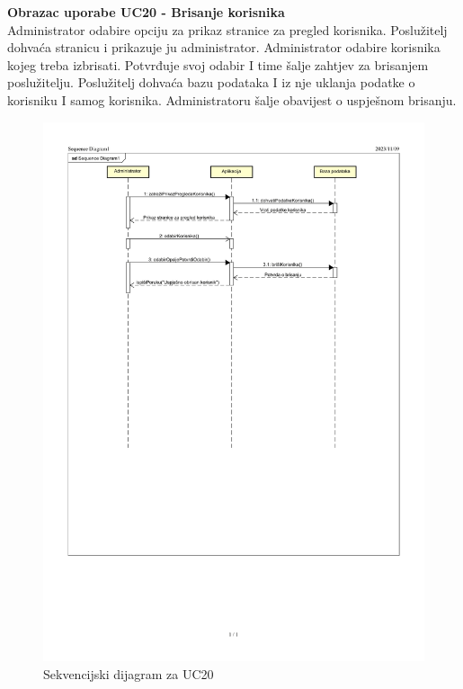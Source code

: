 				\eject
				
				
				\textbf{\large Obrazac uporabe UC20 - Brisanje korisnika}\\
				
				Administrator odabire opciju za prikaz stranice za pregled korisnika. Poslužitelj dohvaća stranicu i prikazuje ju administrator. Administrator odabire korisnika kojeg treba izbrisati. Potvrđuje svoj odabir I time šalje zahtjev za brisanjem poslužitelju. Poslužitelj dohvaća bazu podataka I iz nje uklanja podatke o korisniku I samog korisnika. Administratoru šalje obavijest o uspješnom brisanju.
				
				\begin{figure}[H]
						\includegraphics[scale=0.7]{slike/sek_dijagram4-1.PNG} %
						\centering
						\caption{Sekvencijski dijagram za UC20}
						\label{fig:promjene}
				\end{figure}

